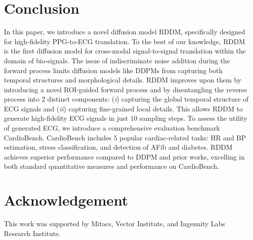 \documentclass[letterpaper]{article} %
\begin{document}
\section{Conclusion}
In this paper, we introduce a novel diffusion model RDDM, specifically designed for high-fidelity PPG-to-ECG translation. To the best of our knowledge, RDDM is the first diffusion model for cross-modal signal-to-signal translation within the domain of bio-signals. The issue of indiscriminate noise addition during the forward process limits diffusion models like DDPMs from capturing both temporal structures and morphological details. RDDM improves upon them by introducing a novel ROI-guided forward process and by disentangling the reverse process into $2$ distinct components: (\textit{i}) capturing the global temporal structure of ECG signals and (\textit{ii}) capturing fine-grained local details. This allows RDDM to generate high-fidelity ECG signals in just $10$ sampling steps. To assess the utility of generated ECG, we introduce a comprehensive evaluation benchmark CardioBench.
CardioBench includes $5$ popular cardiac-related tasks: HR and BP estimation, stress classification, and detection of AFib and diabetes. RDDM achieves superior performance compared to DDPM and prior works, excelling in both standard quantitative measures and performance on CardioBench.

\section*{Acknowledgement}
This work was supported by Mitacs, Vector Institute, and Ingenuity Labs Research Institute.


\end{document}
